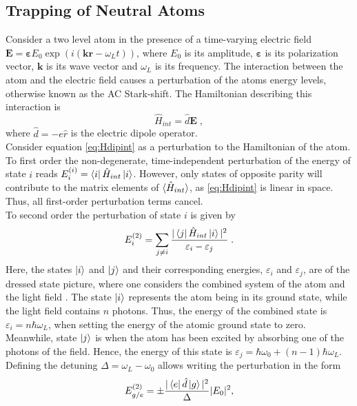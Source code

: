 \subsection{Trapping of Neutral Atoms}
Consider a two level atom in the presence of a time-varying electric field $\boldsymbol{E} = \boldsymbol{\varepsilon} E_0 \exp{ \left( i(\boldsymbol{k} \boldsymbol{r} - \omega_L t) \right)}$, where $E_0$ is its amplitude, $\boldsymbol{\varepsilon}$ is its polarization vector, $\boldsymbol{k}$ is its wave vector and $\omega_L$ is its frequency. The interaction between the atom and the electric field causes a perturbation of the atoms energy levels, otherwise known as the AC Stark-shift. The Hamiltonian describing this interaction is
\begin{equation}
	\hat{H}_{int} = \hat{d} \boldsymbol{E} \; , \label{eq:Hdipint}
\end{equation}
where $\hat{d} = -e \hat{r}$ is the electric dipole operator.\\
Consider equation \eqref{eq:Hdipint} as a perturbation to the Hamiltonian of the atom. To first order the non-degenerate, time-independent perturbation of the energy of state $i$ reads $E_{i}^{(i)} = \bra{i} \hat{H}_{int} \ket{i}$. However, only states of opposite parity will contribute to the matrix elements of $\braket{\hat{H}_{int}}$, as \eqref{eq:Hdipint} is linear in space. Thus, all first-order perturbation terms cancel.\\
To second order the perturbation of state $i$ is given by
\begin{equation}
	E_i^{(2)} = \sum_{j \neq i} \frac{ |\bra{j} \hat{H}_{int}\ket{i}|^2}{\varepsilon_i - \varepsilon_j} \; .
\end{equation}
Here, the states $\ket{i}$ and $\ket{j}$ and their corresponding energies, $\varepsilon_i$ and $\varepsilon_j$, are of the dressed state picture, where one considers the combined system of the atom and the light field \cite{cohen1992atom}. The state $\ket{i}$ represents the atom being in its ground state, while the light field contains $n$ photons. Thus, the energy of the combined state is $\varepsilon_i = n \hbar \omega_L$, when setting the energy of the atomic ground state to zero. Meanwhile, state $\ket{j}$ is when the atom has been excited by absorbing one of the photons of the field. Hence, the energy of this state is $\varepsilon_j = \hbar \omega_0 + (n-1) \hbar \omega_L$. Defining the detuning $\Delta = \omega_L - \omega_0$ allows writing the perturbation in the form
\begin{equation}
	E_{g/e}^{(2)}=\pm  \frac{ |\bra{e}\hat{d}\ket{g}|^2}{\Delta} |E_0|^2,
	\label{2ndpert}
\end{equation}
